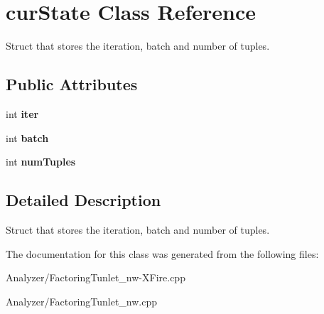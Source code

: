 \hypertarget{structcur_state}{\section{cur\-State Class Reference}
\label{structcur_state}
}


Struct that stores the iteration, batch and number of tuples.  


\subsection*{Public Attributes}
\begin{DoxyCompactItemize}
\item 
\hypertarget{structcur_state_a52f0ae3f978cdf1eb66ef02d1b223e62}{int {\bfseries iter}}\label{structcur_state_a52f0ae3f978cdf1eb66ef02d1b223e62}

\item 
\hypertarget{structcur_state_a9fbda04627b62cc569eb75980d1afecc}{int {\bfseries batch}}\label{structcur_state_a9fbda04627b62cc569eb75980d1afecc}

\item 
\hypertarget{structcur_state_a75c3cd911a5d911cf0c540afe4c406fe}{int {\bfseries num\-Tuples}}\label{structcur_state_a75c3cd911a5d911cf0c540afe4c406fe}

\end{DoxyCompactItemize}


\subsection{Detailed Description}
Struct that stores the iteration, batch and number of tuples. 

The documentation for this class was generated from the following files\-:\begin{DoxyCompactItemize}
\item 
Analyzer/Factoring\-Tunlet\-\_\-nw-\/\-X\-Fire.\-cpp\item 
Analyzer/Factoring\-Tunlet\-\_\-nw.\-cpp\end{DoxyCompactItemize}
